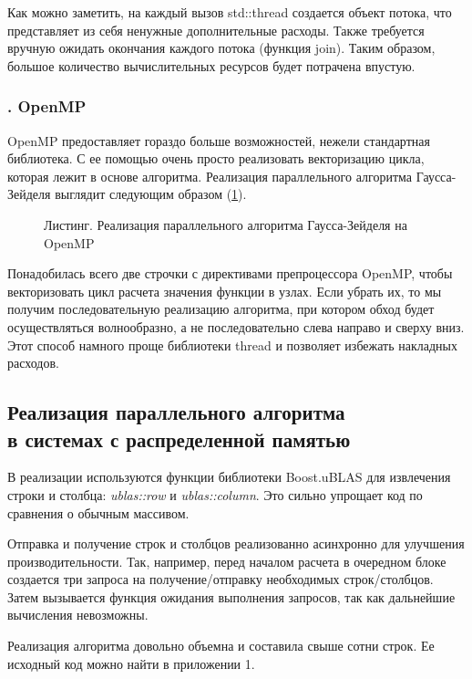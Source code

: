 \documentclass[a4paper,14pt,indentfirst]{extreport}
\begin{document}
Как можно заметить, на каждый вызов std::thread создается объект потока, что представляет из себя ненужные дополнительные расходы. Также требуется вручную ожидать окончания каждого потока (функция join). Таким образом, большое количество вычислительных ресурсов будет потрачена впустую.
\FloatBarrier
{}
\subsubsection*{\thesubsubsection. OpenMP}
OpenMP предоставляет гораздо больше возможностей, нежели стандартная библиотека. С ее помощью очень просто реализовать векторизацию цикла, которая лежит в основе алгоритма. Реализация параллельного алгоритма Гаусса-Зейделя выглядит следующим образом (\cref{openmp}).

\begin{figure}[H]
  
  \caption{Листинг. Реализация параллельного алгоритма Гаусса-Зейделя на OpenMP}
  \label{openmp}
\end{figure}

Понадобилась всего две строчки с директивами препроцессора OpenMP, чтобы векторизовать цикл расчета значения функции в узлах. Если убрать их, то мы получим последовательную реализацию алгоритма, при котором обход будет осуществляться волнообразно, а не последовательно слева направо и сверху вниз. Этот способ намного проще библиотеки thread и позволяет избежать накладных расходов.
\FloatBarrier
\subsection{Реализация параллельного алгоритма\\в системах с распределенной памятью}
В реализации используются функции библиотеки Boost.uBLAS для извлечения строки и столбца: \textit{ublas::row} и \textit{ublas::column}. Это сильно упрощает код по сравнения о обычным массивом.

Отправка и получение строк и столбцов реализованно асинхронно для улучшения производительности. Так, например, перед началом расчета в очередном блоке создается три запроса на получение/отправку необходимых строк/столбцов. Затем вызывается функция ожидания выполнения запросов, так как дальнейшие вычисления невозможны.

Реализация алгоритма довольно объемна и составила свыше сотни строк. Ее исходный код можно найти в приложении 1.
%  
\end{document}
